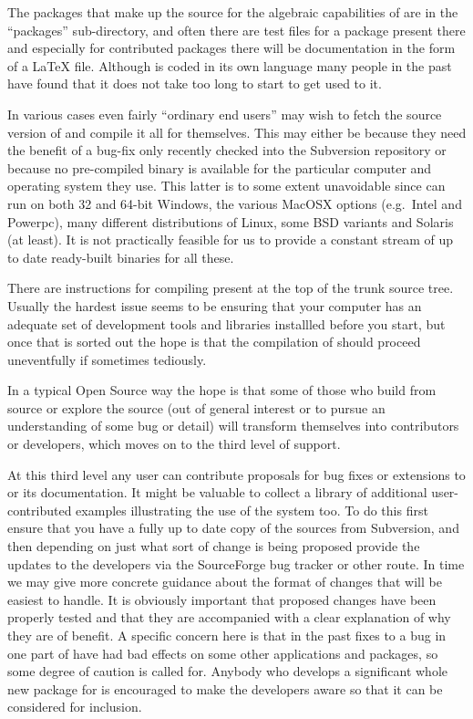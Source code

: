 The packages that make up the source for the algebraic capabilities of
{\REDUCE} are in the ``packages'' sub-directory, and often there are test
files for a package present there and especially for contributed
packages there will be documentation in the form of a \LaTeX{} file.
Although {\REDUCE} is coded in its own language many people in the past
have found that it does not take too long to start to get used to it.

In various cases even fairly ``ordinary end users'' may wish to fetch the 
source version of {\REDUCE} and compile it all for themselves. This may either 
be because they need the benefit of a bug-fix only recently checked into the 
Subversion repository or because no pre-compiled binary is available for the 
particular computer and operating system they use. This latter is to some 
extent unavoidable since {\REDUCE} can run on both 32 and 64-bit Windows, the 
various MacOSX options (e.g.\ Intel and Powerpc), many different distributions 
of Linux, some BSD variants and Solaris (at least). It is not practically 
feasible for us to provide a constant stream of up to date ready-built 
binaries for all these.

There are instructions for compiling {\REDUCE} present at the top of the trunk 
source tree. Usually the hardest issue seems to be ensuring that your 
computer has an adequate set of development tools and libraries installled 
before you start, but once that is sorted out the hope is that the 
compilation of {\REDUCE} should proceed uneventfully if sometimes tediously.

In a typical Open Source way the hope is that some of those who build
{\REDUCE} from source or explore the source (out of general interest
or to pursue an understanding of some bug or detail) will transform
themselves into contributors or developers, which moves on to the
third level of support.

At this third level any user can contribute proposals for bug fixes or
extensions to {\REDUCE} or its documentation. It might be valuable to
collect a library of additional user-contributed examples illustrating
the use of the system too. To do this first ensure that you have a
fully up to date copy of the sources from Subversion, and then
depending on just what sort of change is being proposed provide the
updates to the developers via the SourceForge bug tracker or other
route. In time we may give more concrete guidance about the format of
changes that will be easiest to handle. It is obviously important that
proposed changes have been properly tested and that they are
accompanied with a clear explanation of why they are of benefit. A
specific concern here is that in the past fixes to a bug in one part
of {\REDUCE} have had bad effects on some other applications and
packages, so some degree of caution is called for. Anybody who
develops a significant whole new package for {\REDUCE} is encouraged to
make the developers aware so that it can be considered for inclusion.


